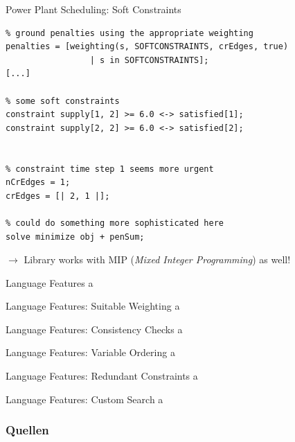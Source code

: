 \documentclass[10pt,xcolor={dvipsnames},fleqn]{beamer}
\begin{document}
\begin{frame}[fragile]{Power Plant Scheduling: Soft Constraints}
\begin{lstlisting}
% ground penalties using the appropriate weighting
penalties = [weighting(s, SOFTCONSTRAINTS, crEdges, true) 
                 | s in SOFTCONSTRAINTS];
[...]

% some soft constraints
constraint supply[1, 2] >= 6.0 <-> satisfied[1]; 
constraint supply[2, 2] >= 6.0 <-> satisfied[2]; 


% constraint time step 1 seems more urgent
nCrEdges = 1;
crEdges = [| 2, 1 |];

% could do something more sophisticated here
solve minimize obj + penSum;
\end{lstlisting}
$\rightarrow$ Library works with MIP (\emph{Mixed Integer Programming}) as well!
\end{frame}


\begin{frame}{Language Features}
a
\end{frame}

\begin{frame}{Language Features: Suitable Weighting}
a
\end{frame}

\begin{frame}{Language Features: Consistency Checks}
a
\end{frame}

\begin{frame}{Language Features: Variable Ordering}
a
\end{frame}

\begin{frame}{Language Features: Redundant Constraints}
a
\end{frame}

\begin{frame}{Language Features: Custom Search}
a
\end{frame}


\begin{frame}[allowframebreaks]
        \frametitle{Quellen}
        
        
\end{frame}
\end{document}
